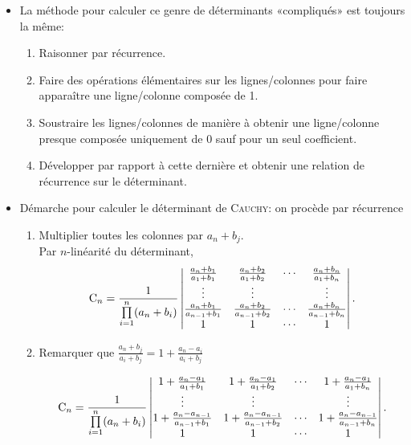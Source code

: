 \begin{itemize}
    \item La méthode pour calculer ce genre de déterminants «compliqués» est toujours la même: 
        \begin{enumerate}
            \item Raisonner par récurrence.
            \item Faire des opérations élémentaires sur les lignes/colonnes pour faire apparaître une ligne/colonne composée de 1. 
            \item Soustraire les lignes/colonnes de manière à obtenir une ligne/colonne presque composée uniquement de 0 sauf pour un seul coefficient. 
            \item Développer par rapport à cette dernière et obtenir une relation de récurrence sur le déterminant. 
        \end{enumerate}
    \item Démarche pour calculer le déterminant de \textsc{Cauchy}:
    on procède par récurrence
    \begin{enumerate}
        \item Multiplier toutes les colonnes par $a_n+b_j$. \\
        Par $n$-linéarité du déterminant,
        $$\mathrm{C}_n = \frac{1}{\prod\limits_{i=1}^{n}(a_n + b_i)} \begin{vmatrix}
            \frac{a_n+b_1}{a_1+b_1} & \frac{a_n+b_2}{a_1+b_2} & \cdots & \frac{a_n+b_n}{a_1+b_n} \\
            \vdots & \vdots & & \vdots \\
            \frac{a_n+b_1}{a_{n-1}+b_1} & \frac{a_n+b_2}{a_{n-1}+b_2} & \cdots & \frac{a_n+b_n}{a_{n-1}+b_n} \\
            1 & 1 & \cdots & 1
        \end{vmatrix}.$$
    
    
        \item Remarquer que $\frac{a_n+b_j}{a_i+b_j} = 1+\frac{a_n-a_i}{a_i+b_j}$
        
        $$\mathrm{C}_n = \frac{1}{\prod\limits_{i=1}^{n}(a_n + b_i)} \begin{vmatrix}
            1+\frac{a_n-a_1}{a_1+b_1} & 1+\frac{a_n-a_1}{a_1+b_2} & \cdots & 1+\frac{a_n-a_1}{a_1+b_n} \\
            \vdots & \vdots & & \vdots \\
            1+\frac{a_n-a_{n-1}}{a_{n-1}+b_1} & 1+\frac{a_n-a_{n-1}}{a_{n-1}+b_2} & \cdots & 1+\frac{a_n-a_{n-1}}{a_{n-1}+b_n} \\
            1 & 1 & \cdots & 1
        \end{vmatrix}.$$
        

\end{enumerate}
\end{itemize}
